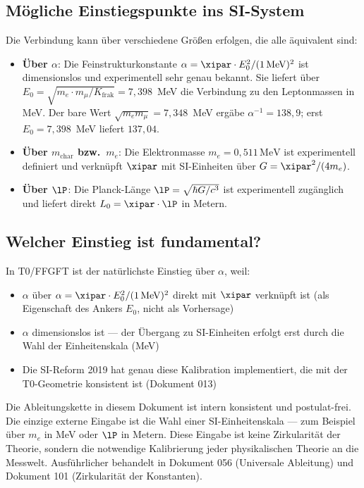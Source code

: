 \subsection{Mögliche Einstiegspunkte ins SI-System}

Die Verbindung kann über verschiedene Größen erfolgen, die alle äquivalent sind:

\begin{itemize}
	\item \textbf{Über $\alpha$}: Die Feinstrukturkonstante $\alpha = \xipar \cdot E_0^2 / (1\,\text{MeV})^2$ ist dimensionslos und experimentell sehr genau bekannt. Sie liefert über $E_0 = \sqrt{m_e \cdot m_\mu / K_{\text{frak}}} = 7{,}398$~MeV die Verbindung zu den Leptonmassen in MeV. Der bare Wert $\sqrt{m_e m_\mu} = 7{,}348$~MeV ergäbe $\alpha^{-1} = 138{,}9$; erst $E_0 = 7{,}398$~MeV liefert $137{,}04$.
	\item \textbf{Über $m_{\text{char}}$ bzw.\ $m_e$}: Die Elektronmasse $m_e = 0{,}511\,\text{MeV}$ ist experimentell definiert und verknüpft $\xipar$ mit SI-Einheiten über $G = \xipar^2/(4m_e)$.
	\item \textbf{Über $\lP$}: Die Planck-Länge $\lP = \sqrt{\hbar G/c^3}$ ist experimentell zugänglich und liefert direkt $L_0 = \xipar \cdot \lP$ in Metern.
\end{itemize}

\subsection{Welcher Einstieg ist fundamental?}

In T0/FFGFT ist der natürlichste Einstieg über $\alpha$, weil:
\begin{itemize}
	\item $\alpha$ über $\alpha = \xipar \cdot E_0^2 / (1\,\text{MeV})^2$ direkt mit $\xipar$ verknüpft ist (als Eigenschaft des Ankers $E_0$, nicht als Vorhersage)
	\item $\alpha$ dimensionslos ist — der Übergang zu SI-Einheiten erfolgt erst durch die Wahl der Einheitenskala (MeV)
	\item Die SI-Reform 2019 hat genau diese Kalibration implementiert, die mit der T0-Geometrie konsistent ist (Dokument 013)
\end{itemize}

\begin{keyresult}
Die Ableitungskette in diesem Dokument ist intern konsistent und postulat-frei. Die einzige externe Eingabe ist die Wahl einer SI-Einheitenskala — zum Beispiel über $m_e$ in MeV oder $\lP$ in Metern. Diese Eingabe ist keine Zirkularität der Theorie, sondern die notwendige Kalibrierung jeder physikalischen Theorie an die Messwelt. Ausführlicher behandelt in Dokument 056 (Universale Ableitung) und Dokument 101 (Zirkularität der Konstanten).
\end{keyresult}


